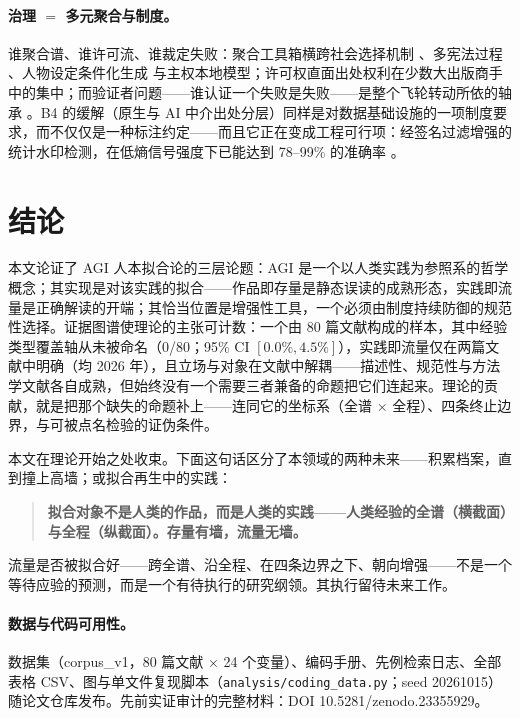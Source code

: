 \documentclass[10pt,fontset=fandol]{ctexart}
\begin{document}
\paragraph{治理 $=$ 多元聚合与制度。}
谁聚合谱、谁许可流、谁裁定失败：聚合工具箱横跨社会选择机制 \cite{park2024rlhf}、多宪法过程 \cite{huang2024collective}、人物设定条件化生成 \cite{ge2024scaling} 与主权本地模型；许可权直面出处权利在少数大出版商手中的集中；而验证者问题——谁认证一个失败是失败——是整个飞轮转动所依的轴承 \cite{yu2026failure, gharbi2026model}。B4 的缓解（原生与 AI 中介出处分层）同样是对数据基础设施的一项制度要求，而不仅仅是一种标注约定——而且它正在变成工程可行项：经签名过滤增强的统计水印检测，在低熵信号强度下已能达到 78--99\% 的准确率 \cite{hong2026signature}。

\section{结论}\label{sec:conclusion}

本文论证了 AGI 人本拟合论的三层论题：AGI 是一个以人类实践为参照系的哲学概念；其实现是对该实践的拟合——作品即存量是静态误读的成熟形态，实践即流量是正确解读的开端；其恰当位置是增强性工具，一个必须由制度持续防御的规范性选择。证据图谱使理论的主张可计数：一个由 80 篇文献构成的样本，其中经验类型覆盖轴从未被命名（0/80；95\% CI $[0.0\%, 4.5\%]$），实践即流量仅在两篇文献中明确（均 2026 年），且立场与对象在文献中解耦——描述性、规范性与方法学文献各自成熟，但始终没有一个需要三者兼备的命题把它们连起来。理论的贡献，就是把那个缺失的命题补上——连同它的坐标系（全谱 $\times$ 全程）、四条终止边界，与可被点名检验的证伪条件。

本文在理论开始之处收束。下面这句话区分了本领域的两种未来——积累档案，直到撞上高墙；或拟合再生中的实践：

\begin{quote}
\textbf{拟合对象不是人类的作品，而是人类的实践——人类经验的全谱（横截面）与全程（纵截面）。存量有墙，流量无墙。}
\end{quote}

流量是否被拟合好——跨全谱、沿全程、在四条边界之下、朝向增强——不是一个等待应验的预测，而是一个有待执行的研究纲领。其执行留待未来工作。

\medskip
\paragraph{数据与代码可用性。}
数据集（corpus\_v1，80 篇文献 $\times$ 24 个变量）、编码手册、先例检索日志、全部表格 CSV、图与单文件复现脚本（\texttt{analysis/coding\_data.py}；seed 20261015）随论文仓库发布。先前实证审计的完整材料：DOI 10.5281/zenodo.23355929。
\end{document}

